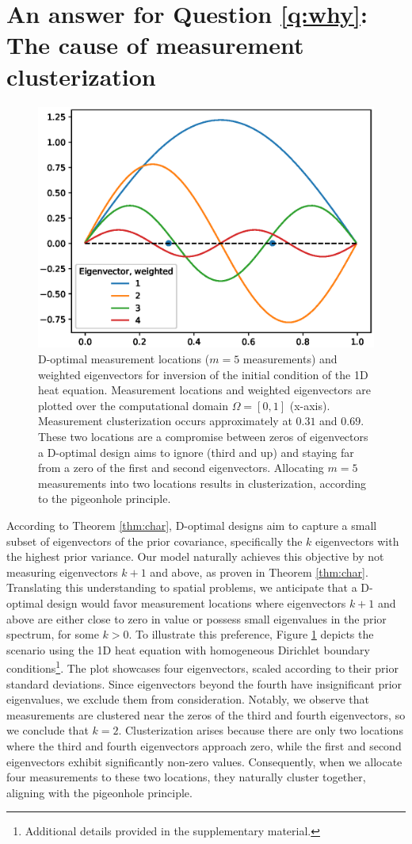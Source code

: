 \section{An answer for Question \ref{q:why}: The cause of measurement clusterization}\label{section:why}
\begin{figure}[H]
    \centering
    \includegraphics[height=0.5\textwidth]{eigenvectors.eps}
    \caption{D-optimal measurement locations ($m=5$ measurements) and
      weighted eigenvectors for inversion of the initial condition of
      the 1D heat equation. Measurement locations and weighted
      eigenvectors are plotted over the computational domain $\Omega =
      [0, 1]$ (x-axis). Measurement clusterization occurs
      approximately at $0.31$ and $0.69$. These two locations are a
      compromise between zeros of eigenvectors a D-optimal design aims
      to ignore (third and up) and staying far from a zero of the
      first and second eigenvectors. Allocating $m=5$ measurements
      into two locations results in clusterization, according to the
      pigeonhole principle.}
  \label{fig:why}
\end{figure}


According to Theorem \ref{thm:char}, D-optimal designs aim to capture
a small subset of eigenvectors of the prior covariance, specifically
the $k$ eigenvectors with the highest prior variance. Our model
naturally achieves this objective by not measuring eigenvectors $k+1$
and above, as proven in Theorem \ref{thm:char}. Translating this
understanding to spatial problems, we anticipate that a D-optimal
design would favor measurement locations where eigenvectors $k+1$ and
above are either close to zero in value or possess small eigenvalues
in the prior spectrum, for some $k > 0$. To illustrate this
preference, Figure \ref{fig:why} depicts the scenario using the 1D
heat equation with homogeneous Dirichlet boundary
conditions\footnote{Additional details provided in the supplementary
material.}. The plot showcases four eigenvectors, scaled according to
their prior standard deviations. Since eigenvectors beyond the fourth
have insignificant prior eigenvalues, we exclude them from
consideration. Notably, we observe that measurements are clustered
near the zeros of the third and fourth eigenvectors, so we conclude
that $k=2$. Clusterization arises because there are only two locations
where the third and fourth eigenvectors approach zero, while the first
and second eigenvectors exhibit significantly non-zero
values. Consequently, when we allocate four measurements to these two
locations, they naturally cluster together, aligning with the
pigeonhole principle.
